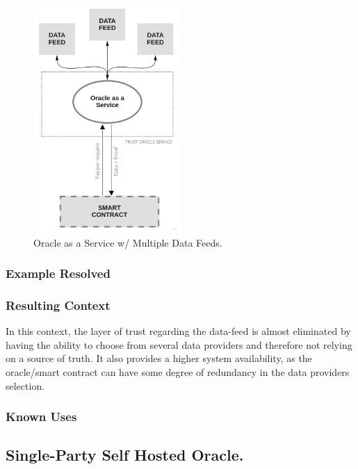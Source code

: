 \begin{figure}[t]
  \begin{center}
    \leavevmode
    \includegraphics[width=0.5\textwidth]{figures/oraclearch2.jpg}
    \caption{Oracle as a Service w/ Multiple Data Feeds.}
    \label{fig:/figures/paper-screening}
  \end{center}
\end{figure}

\subsubsection{Example Resolved}

\subsubsection{Resulting Context}
In this context, the layer of trust regarding the data-feed is almost eliminated by having the ability to choose from several data providers and therefore not relying on a source of truth. It also provides a higher system availability, as the oracle/smart contract can have some degree of redundancy in the data providers selection.

\subsubsection{Known Uses}

\subsection{Single-Party Self Hosted Oracle.}\label{SPSelfHostedOracle}

